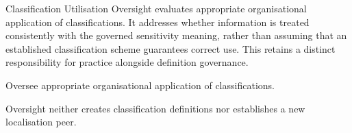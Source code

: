 Classification Utilisation Oversight evaluates appropriate organisational application of classifications. It addresses whether information is treated consistently with the governed sensitivity meaning, rather than assuming that an established classification scheme guarantees correct use. This retains a distinct responsibility for practice alongside definition governance.



Oversee appropriate organisational application of classifications.



Oversight neither creates classification definitions nor establishes a new localisation peer.


